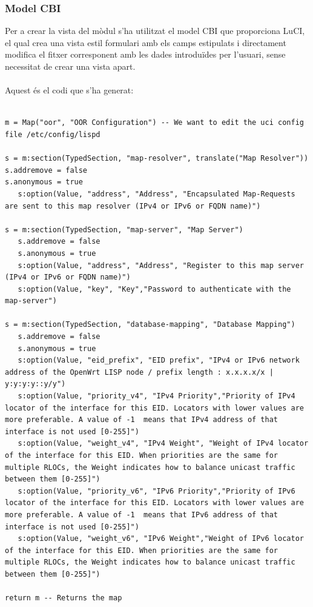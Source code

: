 \documentclass[11pt]{article}
\begin{document}
\subsubsection{Model CBI}
Per a crear la vista del mòdul s’ha utilitzat el model CBI que proporciona LuCI, el qual crea una vista estil formulari amb els camps estipulats i directament modifica el fitxer corresponent amb les dades introduïdes per l’usuari, sense necessitat de crear una vista apart.\\
\\
Aquest és el codi que s'ha generat:\\
\begin{lstlisting}[frame=single]

m = Map("oor", "OOR Configuration") -- We want to edit the uci config file /etc/config/lispd

s = m:section(TypedSection, "map-resolver", translate("Map Resolver"))
s.addremove = false
s.anonymous = true
   s:option(Value, "address", "Address", "Encapsulated Map-Requests are sent to this map resolver (IPv4 or IPv6 or FQDN name)")

s = m:section(TypedSection, "map-server", "Map Server")
   s.addremove = false
   s.anonymous = true
   s:option(Value, "address", "Address", "Register to this map server (IPv4 or IPv6 or FQDN name)")
   s:option(Value, "key", "Key","Password to authenticate with the map-server")

s = m:section(TypedSection, "database-mapping", "Database Mapping")
   s.addremove = false
   s.anonymous = true
   s:option(Value, "eid_prefix", "EID prefix", "IPv4 or IPv6 network address of the OpenWrt LISP node / prefix length : x.x.x.x/x | y:y:y:y::y/y")
   s:option(Value, "priority_v4", "IPv4 Priority","Priority of IPv4 locator of the interface for this EID. Locators with lower values are more preferable. A value of -1  means that IPv4 address of that interface is not used [0-255]")
   s:option(Value, "weight_v4", "IPv4 Weight", "Weight of IPv4 locator of the interface for this EID. When priorities are the same for multiple RLOCs, the Weight indicates how to balance unicast traffic between them [0-255]")
   s:option(Value, "priority_v6", "IPv6 Priority","Priority of IPv6 locator of the interface for this EID. Locators with lower values are more preferable. A value of -1  means that IPv6 address of that interface is not used [0-255]")
   s:option(Value, "weight_v6", "IPv6 Weight","Weight of IPv6 locator of the interface for this EID. When priorities are the same for multiple RLOCs, the Weight indicates how to balance unicast traffic between them [0-255]")

return m -- Returns the map
\end{lstlisting}
\end{document}
